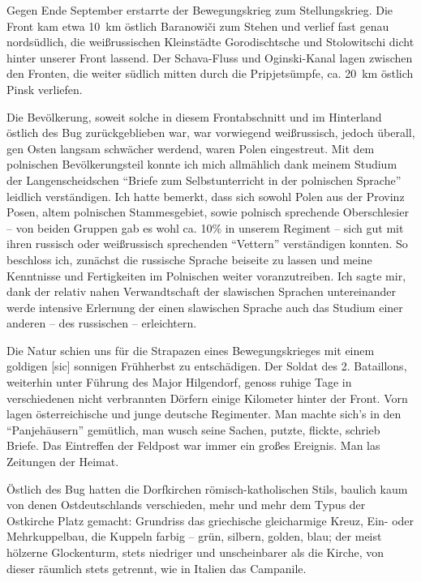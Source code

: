 Gegen Ende September erstarrte der Bewegungskrieg zum Stellungskrieg. Die Front kam etwa 10~km östlich Baranowiči zum Stehen und verlief fast genau nordsüdlich, die weißrussischen Kleinstädte Gorodischtsche und Stolowitschi dicht hinter unserer Front lassend. Der Schava-Fluss und Oginski-Kanal lagen zwischen den Fronten, die weiter südlich mitten durch die Pripjet\-sümpfe, ca. 20~km östlich Pinsk verliefen.

Die Bevölkerung, soweit solche in diesem Frontabschnitt und im Hinterland östlich des Bug zurückgeblieben war, war vorwiegend weißrussisch, jedoch überall, gen Osten langsam schwächer werdend, waren Polen eingestreut. Mit dem polnischen Bevölkerungsteil konnte ich mich allmählich dank meinem Studium der Langenscheidschen \enquote{Briefe zum Selbstunterricht in der polnischen Sprache} leidlich verständigen. Ich hatte bemerkt, dass sich sowohl Polen aus der Provinz Posen, altem polnischen Stammesgebiet, sowie polnisch sprechende Oberschlesier -- von beiden Gruppen gab es wohl ca. 10\% in unserem Regiment -- sich gut mit ihren russisch oder weißrussisch sprechenden \enquote{Vettern} verständigen konnten. So beschloss ich, zunächst die russische Sprache beiseite zu lassen und meine Kenntnisse und Fertigkeiten im Polnischen weiter voranzutreiben. Ich sagte mir, dank der relativ nahen Verwandtschaft der slawischen Sprachen untereinander werde intensive Erlernung der einen slawischen Sprache auch das Studium einer anderen -- des russischen -- erleichtern.

Die Natur schien uns für die Strapazen eines Bewegungskrieges mit einem goldigen [sic] sonnigen Frühherbst zu entschädigen. Der Soldat des 2. Bataillons, weiterhin unter Führung des Major Hilgendorf, genoss ruhige Tage in verschiedenen nicht verbrannten Dörfern einige Kilometer hinter der Front. Vorn lagen österreichische und junge deutsche Regimenter. Man machte sich's in den \enquote{Panjehäusern} gemütlich, man wusch seine Sachen, putzte, flickte, schrieb Briefe. Das Eintreffen der Feldpost war immer ein großes Ereignis. Man las Zeitungen der Heimat.

Östlich des Bug hatten die Dorfkirchen römisch-katholischen Stils, baulich kaum von denen Ostdeutschlands verschieden, mehr und mehr dem Typus der Ostkirche Platz gemacht: Grundriss das griechische gleicharmige Kreuz, Ein- oder Mehrkuppelbau, die Kuppeln farbig -- grün, silbern, golden, blau; der meist hölzerne Glockenturm, stets niedriger und unscheinbarer als die Kirche, von dieser räumlich stets getrennt, wie in Italien das Campanile.

